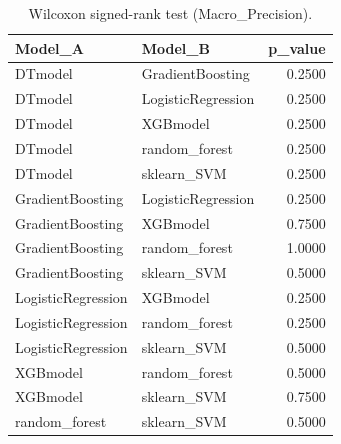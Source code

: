 \begin{table}[t]
\centering
\begin{tabular}{llr}
\toprule
Model_A & Model_B & p_value \\
\midrule
DTmodel & GradientBoosting & 0.2500 \\
DTmodel & LogisticRegression & 0.2500 \\
DTmodel & XGBmodel & 0.2500 \\
DTmodel & random_forest & 0.2500 \\
DTmodel & sklearn_SVM & 0.2500 \\
GradientBoosting & LogisticRegression & 0.2500 \\
GradientBoosting & XGBmodel & 0.7500 \\
GradientBoosting & random_forest & 1.0000 \\
GradientBoosting & sklearn_SVM & 0.5000 \\
LogisticRegression & XGBmodel & 0.2500 \\
LogisticRegression & random_forest & 0.2500 \\
LogisticRegression & sklearn_SVM & 0.5000 \\
XGBmodel & random_forest & 0.5000 \\
XGBmodel & sklearn_SVM & 0.7500 \\
random_forest & sklearn_SVM & 0.5000 \\
\bottomrule
\end{tabular}
\caption{Wilcoxon signed-rank test (Macro_Precision).}
\label{tab:wilcoxon_Macro_Precision}
\end{table}